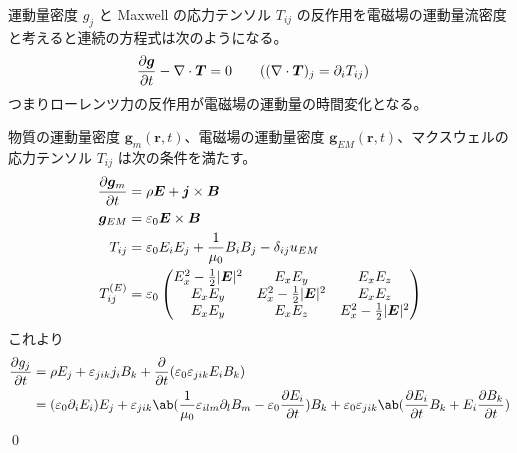 \documentclass[uplatex,dvipdfmx,a4paper,11pt]{jlreq}
\makeatletter
\newcommand{\EE}{\bm{E}}
\newcommand{\BB}{\bm{B}}
\newcommand{\rr}{\bm{r}}
\newcommand{\vnabla}{\mathbf{\nabla}}
\numberwithin{equation}{section}
\theoremstyle{definition}
\renewenvironment{proof}[1][\proofname]{\par
  \normalfont
  \topsep6\p@\@plus6\p@ \trivlist
  \item[\hskip\labelsep{\bfseries #1}\@addpunct{\bfseries}]\ignorespaces\quad\par
}{%
  \qed\endtrivlist\@endpefalse
}
\renewcommand\proofname{証明}
\makeatother
\begin{document}
\begin{theorem}[運動量保存則]
  運動量密度 $g_j$ と Maxwell の応力テンソル $T_{ij}$ の反作用を電磁場の運動量流密度と考えると連続の方程式は次のようになる。
  \begin{align}
    \diffp{\bm{g}}{t} - \vnabla\cdot\bm{T} & = 0 \qquad ((\vnabla\cdot\bm{T})_j = \partial_iT_{ij})
  \end{align}
  つまりローレンツ力の反作用が電磁場の運動量の時間変化となる。
\end{theorem}
\begin{proof}
  物質の運動量密度 $\bm{g}_m(\rr, t)$、電磁場の運動量密度 $\bm{g}_{EM}(\rr, t)$、マクスウェルの応力テンソル $T_{ij}$ は次の条件を満たす。
  \begin{align}
    \diffp{\bm{g}_m}{t} & = \rho\EE + \bm{j}\times\BB                                                                         \\
    \bm{g}_{EM}         & = \varepsilon_0\EE\times\BB                                                                         \\
    T_{ij}              & = \varepsilon_0E_iE_j + \frac{1}{\mu_0}B_iB_j - \delta_{ij}u_{EM}                                   \\
    T_{ij}^{(E)}        & = \varepsilon_0\begin{pmatrix}
                                           E_x^2 - \frac{1}{2}|\EE|^2 & E_xE_y                     & E_xE_z                     \\
                                           E_xE_y                     & E_x^2 - \frac{1}{2}|\EE|^2 & E_xE_z                     \\
                                           E_xE_y                     & E_xE_z                     & E_x^2 - \frac{1}{2}|\EE|^2 \\
                                         \end{pmatrix}
  \end{align}
  これより
  \begin{align}
    \diffp{g_j}{t} & = \rho E_j + \varepsilon_{jik}j_iB_k + \diffp{}{t}(\varepsilon_0\varepsilon_{jik}E_iB_k)                                                                                                                            \\
                   & = (\varepsilon_0\partial_iE_i)E_j + \varepsilon_{jik}\ab(\frac{1}{\mu_0}\varepsilon_{ilm}\partial_lB_m - \varepsilon_0\diffp{E_i}{t})B_k + \varepsilon_0\varepsilon_{jik}\ab(\diffp{E_i}{t}B_k + E_i\diffp{B_k}{t}) \\

\end{align}
\end{proof}
\end{document}

